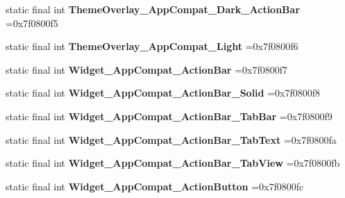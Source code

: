 \begin{DoxyCompactItemize}
\item 
\hypertarget{classcheck_1_1test_1_1_r_1_1style_a700cb112ab3f77e6e0af7b05ba22b12f}{}static final int {\bfseries Theme\+Overlay\+\_\+\+App\+Compat\+\_\+\+Dark\+\_\+\+Action\+Bar} =0x7f0800f5\label{classcheck_1_1test_1_1_r_1_1style_a700cb112ab3f77e6e0af7b05ba22b12f}

\item 
\hypertarget{classcheck_1_1test_1_1_r_1_1style_a045b1ee42bfea8ffb9fb9d5ae8ee1397}{}static final int {\bfseries Theme\+Overlay\+\_\+\+App\+Compat\+\_\+\+Light} =0x7f0800f6\label{classcheck_1_1test_1_1_r_1_1style_a045b1ee42bfea8ffb9fb9d5ae8ee1397}

\item 
\hypertarget{classcheck_1_1test_1_1_r_1_1style_a628e6d73f7d3501cfecc7c33a80a0fee}{}static final int {\bfseries Widget\+\_\+\+App\+Compat\+\_\+\+Action\+Bar} =0x7f0800f7\label{classcheck_1_1test_1_1_r_1_1style_a628e6d73f7d3501cfecc7c33a80a0fee}

\item 
\hypertarget{classcheck_1_1test_1_1_r_1_1style_aab338602277b8a15375b7cd0e80a0981}{}static final int {\bfseries Widget\+\_\+\+App\+Compat\+\_\+\+Action\+Bar\+\_\+\+Solid} =0x7f0800f8\label{classcheck_1_1test_1_1_r_1_1style_aab338602277b8a15375b7cd0e80a0981}

\item 
\hypertarget{classcheck_1_1test_1_1_r_1_1style_af9eb683f9bffd9b71ceb7c29e3c646e1}{}static final int {\bfseries Widget\+\_\+\+App\+Compat\+\_\+\+Action\+Bar\+\_\+\+Tab\+Bar} =0x7f0800f9\label{classcheck_1_1test_1_1_r_1_1style_af9eb683f9bffd9b71ceb7c29e3c646e1}

\item 
\hypertarget{classcheck_1_1test_1_1_r_1_1style_ab52ef3cf510837ab741ba29a4c6cbe39}{}static final int {\bfseries Widget\+\_\+\+App\+Compat\+\_\+\+Action\+Bar\+\_\+\+Tab\+Text} =0x7f0800fa\label{classcheck_1_1test_1_1_r_1_1style_ab52ef3cf510837ab741ba29a4c6cbe39}

\item 
\hypertarget{classcheck_1_1test_1_1_r_1_1style_a3e6e90152e8e737ba3d8b125a5ab5fd2}{}static final int {\bfseries Widget\+\_\+\+App\+Compat\+\_\+\+Action\+Bar\+\_\+\+Tab\+View} =0x7f0800fb\label{classcheck_1_1test_1_1_r_1_1style_a3e6e90152e8e737ba3d8b125a5ab5fd2}

\item 
\hypertarget{classcheck_1_1test_1_1_r_1_1style_af99f77261bbbe99b4cd4964925d1cb28}{}static final int {\bfseries Widget\+\_\+\+App\+Compat\+\_\+\+Action\+Button} =0x7f0800fc\label{classcheck_1_1test_1_1_r_1_1style_af99f77261bbbe99b4cd4964925d1cb28}


\end{DoxyCompactItemize}
